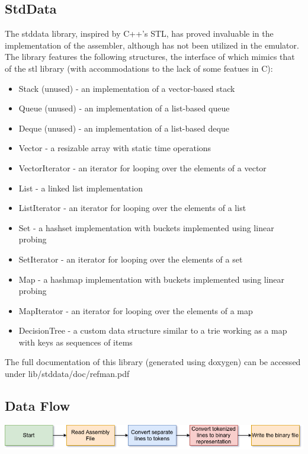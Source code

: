 \documentclass[11pt]{article}
\begin{document}
\subsection*{StdData}
The stddata library, inspired by C++'s STL, has proved invaluable in the implementation of the assembler, although has not been utilized in the emulator. The library features the following structures, the interface of which mimics that of the stl library (with accommodations to the lack of some featues in C):
\begin{itemize}
\item Stack (unused) - an implementation of a vector-based stack
\item Queue (unused) - an implementation of a list-based queue
\item Deque (unused) - an implementation of a list-based deque
\item Vector - a resizable array with static time operations
\item VectorIterator - an iterator for looping over the elements of a vector
\item List - a linked list implementation
\item ListIterator - an iterator for looping over the elements of a list
\item Set - a hashset implementation with buckets implemented using linear probing
\item SetIterator - an iterator for looping over the elements of a set
\item Map - a hashmap implementation with buckets implemented using linear probing
\item MapIterator - an iterator for looping over the elements of a map
\item DecisionTree - a custom data structure similar to a trie working as a map with keys as sequences of items
\end{itemize}
The full documentation of this library (generated using doxygen) can be accessed under lib/stddata/doc/refman.pdf
\subsection*{Data Flow}
\includegraphics[scale=0.6]{assembler_dataflow}
\end{document}
